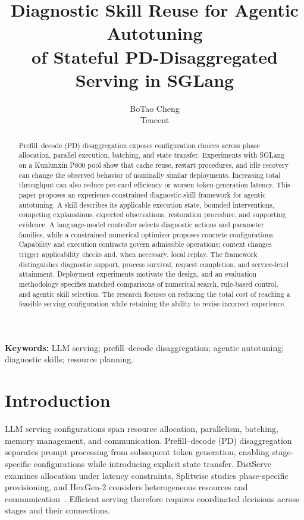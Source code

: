 \documentclass[11pt,a4paper]{article}
\title{Diagnostic Skill Reuse for Agentic Autotuning\\of Stateful PD-Disaggregated Serving in SGLang}
\author{BoTao Cheng\\Tencent}
\date{}
\begin{document}
\maketitle

\begin{abstract}
Prefill--decode (PD) disaggregation exposes configuration choices across phase allocation, parallel execution, batching, and state transfer. Experiments with SGLang on a Kunlunxin P800 pool show that cache reuse, restart procedures, and idle recovery can change the observed behavior of nominally similar deployments. Increasing total throughput can also reduce per-card efficiency or worsen token-generation latency. This paper proposes an experience-constrained diagnostic-skill framework for agentic autotuning. A skill describes its applicable execution state, bounded interventions, competing explanations, expected observations, restoration procedure, and supporting evidence. A language-model controller selects diagnostic actions and parameter families, while a constrained numerical optimizer proposes concrete configurations. Capability and execution contracts govern admissible operations; context changes trigger applicability checks and, when necessary, local replay. The framework distinguishes diagnostic support, process survival, request completion, and service-level attainment. Deployment experiments motivate the design, and an evaluation methodology specifies matched comparisons of numerical search, rule-based control, and agentic skill selection. The research focuses on reducing the total cost of reaching a feasible serving configuration while retaining the ability to revise incorrect experience.

\end{abstract}

\noindent\textbf{Keywords:} LLM serving; prefill--decode disaggregation; agentic autotuning; diagnostic skills; resource planning.

\section{Introduction}
LLM serving configurations span resource allocation, parallelism, batching, memory management, and communication. Prefill--decode (PD) disaggregation separates prompt processing from subsequent token generation, enabling stage-specific configurations while introducing explicit state transfer. DistServe examines allocation under latency constraints, Splitwise studies phase-specific provisioning, and HexGen-2 considers heterogeneous resources and communication~\cite{distserve2024,splitwise2024,hexgen2025}. Efficient serving therefore requires coordinated decisions across stages and their connections.
\end{document}
